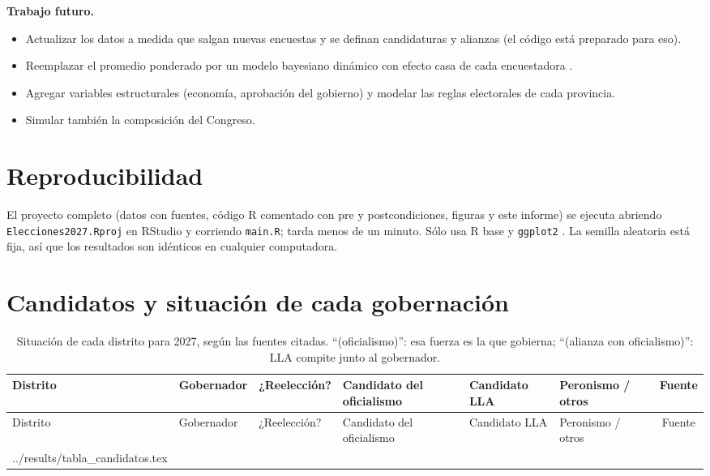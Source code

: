 \documentclass{article}
\makeatletter
\newcommand{\tablainput}[1]{\@@input #1 }
\makeatother
\begin{document}
\textbf{Trabajo futuro.}
\begin{itemize}
  \item Actualizar los datos a medida que salgan nuevas encuestas y se definan
        candidaturas y alianzas (el código está preparado para eso).
  \item Reemplazar el promedio ponderado por un modelo bayesiano dinámico con
        efecto casa de cada encuestadora \cite{linzer2013,heidemanns2020}.
  \item Agregar variables estructurales (economía, aprobación del gobierno) y
        modelar las reglas electorales de cada provincia.
  \item Simular también la composición del Congreso.
\end{itemize}

\section*{Reproducibilidad}
El proyecto completo (datos con fuentes, código R comentado con pre y
postcondiciones, figuras y este informe) se ejecuta abriendo
\texttt{Elecciones2027.Rproj} en RStudio y corriendo \texttt{main.R}; tarda menos
de un minuto. Sólo usa R base \cite{rcore} y \texttt{ggplot2}
\cite{wickham2016}. La semilla aleatoria está fija, así que los resultados son
idénticos en cualquier computadora.




\appendix
\section{Candidatos y situación de cada gobernación}

\begingroup
\scriptsize
\setlength{\tabcolsep}{3pt}
\begin{longtable}{L{1.7cm}L{2.1cm}L{2.0cm}L{3.3cm}L{2.3cm}L{2.6cm}c}
\caption{Situación de cada distrito para 2027, según las fuentes citadas.
``(oficialismo)'': esa fuerza es la que gobierna; ``(alianza con oficialismo)'':
LLA compite junto al gobernador.}
\label{tab:candidatos}\\
\toprule
Distrito & Gobernador & ¿Reelección? & Candidato del oficialismo & Candidato LLA & Peronismo / otros & Fuente \\
\midrule
\endfirsthead
\toprule
Distrito & Gobernador & ¿Reelección? & Candidato del oficialismo & Candidato LLA & Peronismo / otros & Fuente \\
\midrule
\endhead
\bottomrule
\endfoot
\tablainput{../results/tabla_candidatos.tex}
\end{longtable}
\endgroup
\end{document}
